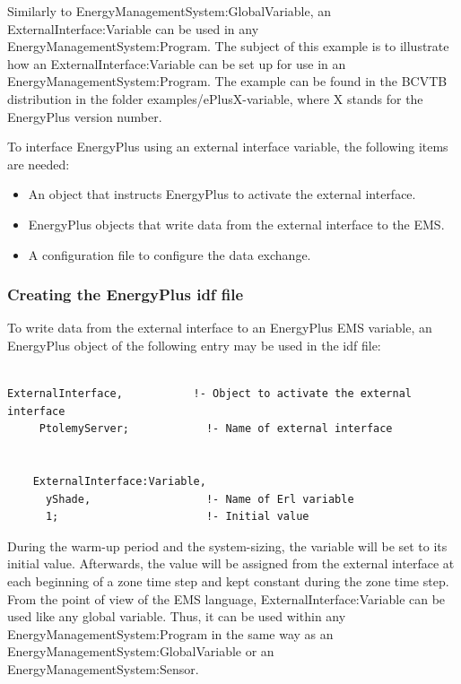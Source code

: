 Similarly to EnergyManagementSystem:GlobalVariable, an ExternalInterface:Variable can be used in any EnergyManagementSystem:Program. The subject of this example is to illustrate how an ExternalInterface:Variable can be set up for use in an EnergyManagementSystem:Program. The example can be found in the BCVTB distribution in the folder examples/ePlusX-variable, where X stands for the EnergyPlus version number.

To interface EnergyPlus using an external interface variable, the following items are needed:

\begin{itemize}
\item
  An object that instructs EnergyPlus to activate the external interface.
\item
  EnergyPlus objects that write data from the external interface to the EMS.
\item
  A configuration file to configure the data exchange.
\end{itemize}

\subsubsection{Creating the EnergyPlus idf file}\label{creating-the-energyplus-idf-file-2}

To write data from the external interface to an EnergyPlus EMS variable, an EnergyPlus object of the following entry may be used in the idf file:

\begin{lstlisting}

ExternalInterface,           !- Object to activate the external interface
     PtolemyServer;            !- Name of external interface


    ExternalInterface:Variable,
      yShade,                  !- Name of Erl variable
      1;                       !- Initial value
\end{lstlisting}

During the warm-up period and the system-sizing, the variable will be set to its initial value. Afterwards, the value will be assigned from the external interface at each beginning of a zone time step and kept constant during the zone time step. From the point of view of the EMS language, ExternalInterface:Variable can be used like any global variable. Thus, it can be used within any EnergyManagementSystem:Program in the same way as an EnergyManagementSystem:GlobalVariable or an EnergyManagementSystem:Sensor.


